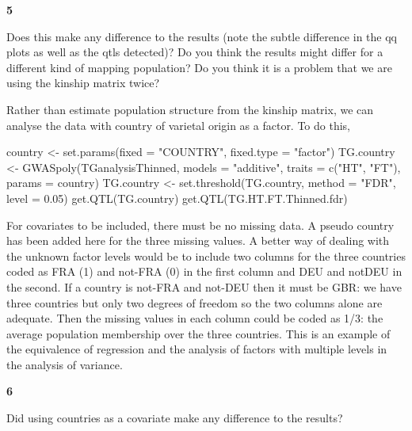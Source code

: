 \documentclass[
]{book}
\makeatletter
\newenvironment{Shaded}{\begin{snugshade}}{\end{snugshade}}
\newcommand{\AttributeTok}[1]{\textcolor[rgb]{0.77,0.63,0.00}{#1}}
\newcommand{\FloatTok}[1]{\textcolor[rgb]{0.00,0.00,0.81}{#1}}
\newcommand{\FunctionTok}[1]{\textcolor[rgb]{0.00,0.00,0.00}{#1}}
\newcommand{\NormalTok}[1]{#1}
\newcommand{\OtherTok}[1]{\textcolor[rgb]{0.56,0.35,0.01}{#1}}
\newcommand{\StringTok}[1]{\textcolor[rgb]{0.31,0.60,0.02}{#1}}
\newenvironment{kframe}{%
\medskip{}
\setlength{\fboxsep}{.8em}
 \def\at@end@of@kframe{}%
 \ifinner\ifhmode%
  \def\at@end@of@kframe{\end{minipage}}%
  \begin{minipage}{\columnwidth}%
 \fi\fi%
 \def\FrameCommand##1{\hskip\@totalleftmargin \hskip-\fboxsep
 \colorbox{shadecolor}{##1}\hskip-\fboxsep
     \hskip-\linewidth \hskip-\@totalleftmargin \hskip\columnwidth}%
 \MakeFramed {\advance\hsize-\width
   \@totalleftmargin\z@ \linewidth\hsize
   \@setminipage}}%
 {\par\unskip\endMakeFramed%
 \at@end@of@kframe}
\newenvironment{rmdblock}[1]
  {
  \begin{itemize}
  \renewcommand{\labelitemi}{
    \raisebox{-.7\height}[0pt][0pt]{
      {\setkeys{Gin}{width=3em,keepaspectratio}\texttt{[image: images/\#1]}}
    }
  }
  \setlength{\fboxsep}{1em}
  \begin{kframe}
  \item
  }
  {
  \end{kframe}
  \end{itemize}
  }
\newenvironment{rmdquiz}
  {\begin{rmdblock}{quiz}}
  {\end{rmdblock}}
\makeatother
\begin{document}
\begin{rmdquiz}
\textbf{5}

Does this make any difference to the results (note the subtle difference in the qq plots as well as the qtls detected)? Do you think the results might differ for a different kind of mapping population? Do you think it is a problem that we are using the kinship matrix twice?
\end{rmdquiz}

Rather than estimate population structure from the kinship matrix, we can analyse the data with country of varietal origin as a factor. To do this,

\begin{Shaded}
\begin{Highlighting}[]
\NormalTok{country }\OtherTok{\textless{}{-}} \FunctionTok{set.params}\NormalTok{(}\AttributeTok{fixed =} \StringTok{"COUNTRY"}\NormalTok{, }\AttributeTok{fixed.type =} \StringTok{"factor"}\NormalTok{)}
\NormalTok{TG.country }\OtherTok{\textless{}{-}} \FunctionTok{GWASpoly}\NormalTok{(TGanalysisThinned, }\AttributeTok{models =} \StringTok{"additive"}\NormalTok{, }
    \AttributeTok{traits =} \FunctionTok{c}\NormalTok{(}\StringTok{"HT"}\NormalTok{, }\StringTok{"FT"}\NormalTok{), }\AttributeTok{params =}\NormalTok{ country)}
\NormalTok{TG.country }\OtherTok{\textless{}{-}} \FunctionTok{set.threshold}\NormalTok{(TG.country, }\AttributeTok{method =} \StringTok{"FDR"}\NormalTok{, }\AttributeTok{level =} \FloatTok{0.05}\NormalTok{)}
\FunctionTok{get.QTL}\NormalTok{(TG.country)}
\FunctionTok{get.QTL}\NormalTok{(TG.HT.FT.Thinned.fdr)}
\end{Highlighting}
\end{Shaded}

For covariates to be included, there must be no missing data. A pseudo country has been added here for the three missing values. A better way of dealing with the unknown factor levels would be to include two columns for the three countries coded as FRA (1) and not-FRA (0) in the first column and DEU and notDEU in the second. If a country is not-FRA and not-DEU then it must be GBR: we have three countries but only two degrees of freedom so the two columns alone are adequate. Then the missing values in each column could be coded as 1/3: the average population membership over the three countries. This is an example of the equivalence of regression and the analysis of factors with multiple levels in the analysis of variance.

\begin{rmdquiz}
\textbf{6}

Did using countries as a covariate make any difference to the results?
\end{rmdquiz}
\end{document}
